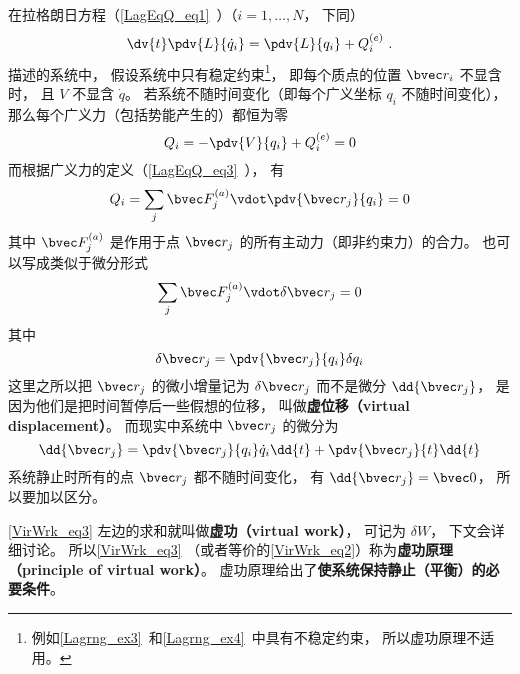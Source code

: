 
\begin{issues}
\issueTODO
\end{issues}


在拉格朗日方程（\autoref{LagEqQ_eq1}~）（$i=1,\dots,N$， 下同）
\begin{equation}\label{VirWrk_eq1}
\dv{t} \pdv{L}{\dot q_i} = \pdv{L}{q_i} + Q_i^{(e)}~.
\end{equation}
描述的系统中， 假设系统中只有稳定约束\footnote{例如\autoref{Lagrng_ex3}~和\autoref{Lagrng_ex4}~中具有不稳定约束， 所以虚功原理不适用。}， 即每个质点的位置 $\bvec r_i$ 不显含时， 且 $V$ 不显含 $\dot q$。 若系统不随时间变化（即每个广义坐标 $q_i$ 不随时间变化）， 那么每个广义力（包括势能产生的）都恒为零
\begin{equation}\label{VirWrk_eq2}
Q_i = -\pdv{V}{q_i} + Q_i^{(e)} = 0
\end{equation}
而根据广义力的定义（\autoref{LagEqQ_eq3}~）， 有
\begin{equation}
Q_i = \sum_j \bvec F_j^{(a)} \vdot \pdv{\bvec r_j}{q_i} = 0
\end{equation}
其中 $\bvec F_j^{(a)}$ 是作用于点 $\bvec r_j$ 的所有主动力（即非约束力）的合力。 也可以写成类似于微分形式
\begin{equation}\label{VirWrk_eq3}
\sum_j \bvec F_j^{(a)} \vdot \delta \bvec r_j = 0
\end{equation}
其中
\begin{equation}
\delta \bvec r_j = \pdv{\bvec r_j}{q_i}\delta{q_i}
\end{equation}
这里之所以把 $\bvec r_j$ 的微小增量记为 $\delta \bvec r_j$ 而不是微分 $\dd{\bvec r_j}$， 是因为他们是把时间暂停后一些假想的位移， 叫做\textbf{虚位移（virtual displacement）}。 而现实中系统中 $\bvec r_j$ 的微分为
\begin{equation}
\dd{\bvec r_j} = \pdv{\bvec r_j}{q_i}\dot{q}_i\dd{t} + \pdv{\bvec r_j}{t}\dd{t}
\end{equation}
系统静止时所有的点 $\bvec r_j$ 都不随时间变化， 有 $\dd{\bvec r_j} = \bvec 0$， 所以要加以区分。

\autoref{VirWrk_eq3} 左边的求和就叫做\textbf{虚功（virtual work）}， 可记为 $\delta W$， 下文会详细讨论。 所以\autoref{VirWrk_eq3} （或者等价的\autoref{VirWrk_eq2}）称为\textbf{虚功原理（principle of virtual work）}。 虚功原理给出了\textbf{使系统保持静止（平衡）的必要条件}。

